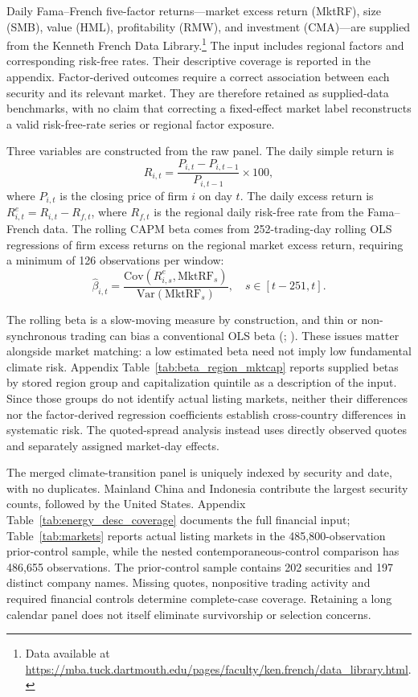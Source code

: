 \documentclass{article}
\theoremstyle{plain}
\begin{document}
Daily Fama--French five-factor returns---market excess return (MktRF), size (SMB), value (HML), profitability (RMW), and investment (CMA)---are supplied from the Kenneth French Data Library.\footnote{Data available at \url{https://mba.tuck.dartmouth.edu/pages/faculty/ken.french/data_library.html}.} The input includes regional factors and corresponding risk-free rates. Their descriptive coverage is reported in the appendix. Factor-derived outcomes require a correct association between each security and its relevant market. They are therefore retained as supplied-data benchmarks, with no claim that correcting a fixed-effect market label reconstructs a valid risk-free-rate series or regional factor exposure.

Three variables are constructed from the raw panel. The daily simple return is
\begin{equation}
R_{i,t} = \frac{P_{i,t} - P_{i,t-1}}{P_{i,t-1}} \times 100,
\end{equation}
where $P_{i,t}$ is the closing price of firm $i$ on day $t$. The daily excess return is $R^e_{i,t} = R_{i,t} - R_{f,t}$, where $R_{f,t}$ is the regional daily risk-free rate from the Fama--French data. The rolling CAPM beta comes from 252-trading-day rolling OLS regressions of firm excess returns on the regional market excess return, requiring a minimum of 126 observations per window:
\begin{equation}
\hat{\beta}_{i,t} = \frac{\text{Cov}(R^e_{i,s}, \text{MktRF}_s)}{\text{Var}(\text{MktRF}_s)}, \quad s \in [t-251, t].
\end{equation}

The rolling beta is a slow-moving measure by construction, and thin or non-synchronous trading can bias a conventional OLS beta (\cite{ScholesWilliams1977}; \cite{Dimson1979}). These issues matter alongside market matching: a low estimated beta need not imply low fundamental climate risk. Appendix Table~\ref{tab:beta_region_mktcap} reports supplied betas by stored region group and capitalization quintile as a description of the input. Since those groups do not identify actual listing markets, neither their differences nor the factor-derived regression coefficients establish cross-country differences in systematic risk. The quoted-spread analysis instead uses directly observed quotes and separately assigned market-day effects.

The merged climate-transition panel is uniquely indexed by security and date, with no duplicates. Mainland China and Indonesia contribute the largest security counts, followed by the United States. Appendix Table~\ref{tab:energy_desc_coverage} documents the full financial input; Table~\ref{tab:markets} reports actual listing markets in the 485,800-observation prior-control sample, while the nested contemporaneous-control comparison has 486,655 observations. The prior-control sample contains 202 securities and 197 distinct company names. Missing quotes, nonpositive trading activity and required financial controls determine complete-case coverage. Retaining a long calendar panel does not itself eliminate survivorship or selection concerns.
\end{document}
